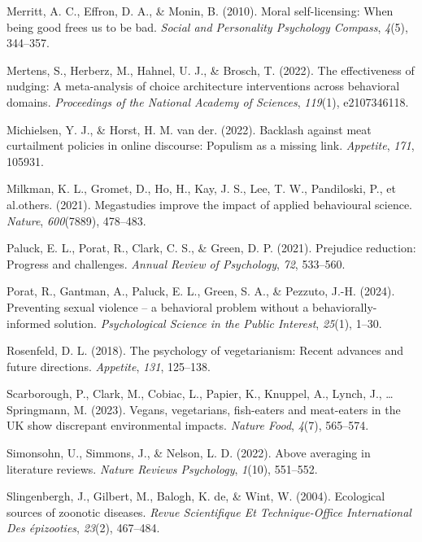 \documentclass[
  man]{apa6}
\newlength{\cslhangindent}
\newenvironment{CSLReferences}[2] %
 {\begin{list}{}{%
  \setlength{\itemindent}{0pt}
  \setlength{\leftmargin}{0pt}
  \setlength{\parsep}{0pt}
  \ifodd #1
   \setlength{\leftmargin}{\cslhangindent}
   \setlength{\itemindent}{-1\cslhangindent}
  \fi
  \setlength{\itemsep}{#2\baselineskip}}}
 {\end{list}}
\begin{document}
\begin{CSLReferences}{1}{0}
Merritt, A. C., Effron, D. A., \& Monin, B. (2010). Moral self-licensing: When being good frees us to be bad. \emph{Social and Personality Psychology Compass}, \emph{4}(5), 344--357.

Mertens, S., Herberz, M., Hahnel, U. J., \& Brosch, T. (2022). The effectiveness of nudging: A meta-analysis of choice architecture interventions across behavioral domains. \emph{Proceedings of the National Academy of Sciences}, \emph{119}(1), e2107346118.

Michielsen, Y. J., \& Horst, H. M. van der. (2022). Backlash against meat curtailment policies in online discourse: Populism as a missing link. \emph{Appetite}, \emph{171}, 105931.

Milkman, K. L., Gromet, D., Ho, H., Kay, J. S., Lee, T. W., Pandiloski, P., et al.others. (2021). Megastudies improve the impact of applied behavioural science. \emph{Nature}, \emph{600}(7889), 478--483.

Paluck, E. L., Porat, R., Clark, C. S., \& Green, D. P. (2021). Prejudice reduction: Progress and challenges. \emph{Annual Review of Psychology}, \emph{72}, 533--560.

Porat, R., Gantman, A., Paluck, E. L., Green, S. A., \& Pezzuto, J.-H. (2024). Preventing sexual violence -- a behavioral problem without a behaviorally-informed solution. \emph{Psychological Science in the Public Interest}, \emph{25}(1), 1--30.

Rosenfeld, D. L. (2018). The psychology of vegetarianism: Recent advances and future directions. \emph{Appetite}, \emph{131}, 125--138.

Scarborough, P., Clark, M., Cobiac, L., Papier, K., Knuppel, A., Lynch, J., \ldots{} Springmann, M. (2023). Vegans, vegetarians, fish-eaters and meat-eaters in the UK show discrepant environmental impacts. \emph{Nature Food}, \emph{4}(7), 565--574.

Simonsohn, U., Simmons, J., \& Nelson, L. D. (2022). Above averaging in literature reviews. \emph{Nature Reviews Psychology}, \emph{1}(10), 551--552.

Slingenbergh, J., Gilbert, M., Balogh, K. de, \& Wint, W. (2004). Ecological sources of zoonotic diseases. \emph{Revue Scientifique Et Technique-Office International Des {é}pizooties}, \emph{23}(2), 467--484.


\end{CSLReferences}
\end{document}
